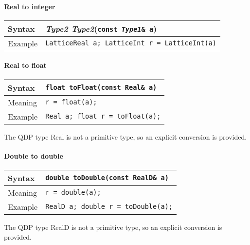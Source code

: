 \documentclass[12pt,letterpaper]{article}
\newcommand{\tLatticeReal}{LatticeReal}
\newcommand{\tLatticeInt}{LatticeInt}
\newcommand{\tReal}{Real}
\newcommand{\tRealD}{RealD}
\begin{document}
\paragraph{Real to integer}

\begin{flushleft}
  \begin{tabular}{|l|l|}
  \hline
  Syntax      & {\it Type2 Type2}({\tt const {\it Type1}\& a})\\
  \hline
  Example     & {\tt \tLatticeReal{} a; \tLatticeInt{} r = \tLatticeInt(a)} \\
  \hline
  \end{tabular}
\end{flushleft}

\paragraph{Real to float} 

\begin{flushleft}
  \begin{tabular}{|l|l|}
  \hline
  Syntax      & {\tt float toFloat(const \tReal\& a)} \\
  \hline
  Meaning     & \verb|r = float(a);|\\
  \hline
  Example     & {\tt \tReal{} a; float r = toFloat(a);} \\
  \hline
  \end{tabular}
\end{flushleft}

The QDP type \tReal{} is not a primitive type, so an explicit conversion is provided.

\paragraph{Double to double} 

\begin{flushleft}
  \begin{tabular}{|l|l|}
  \hline
  Syntax      & {\tt double toDouble(const \tRealD\& a)} \\
  \hline
  Meaning     & \verb|r = double(a);|\\
  \hline
  Example     & {\tt \tRealD{} a; double r = toDouble(a);} \\
  \hline
  \end{tabular}
\end{flushleft}

The QDP type \tRealD{} is not a primitive type, so an explicit conversion is provided.
\end{document}
